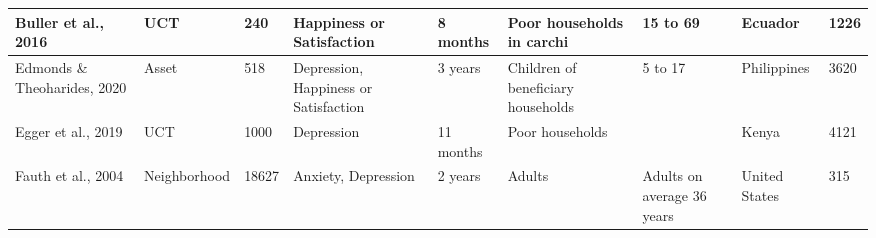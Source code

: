 \begin{table}[ht]
\begin{tabular}{p{1.8cm}p{1.7cm}p{1.3 cm}p{2cm}p{1.7cm}p{2.0cm}p{1cm}p{1.2cm}p{1cm}}
   \hline
Buller et al., 2016 & UCT & 240 & Happiness or Satisfaction & 8 months & Poor households in carchi & 15 to 69 & Ecuador & 1226 \\ 
   \hline
Edmonds \& Theoharides, 2020 & Asset & 518 & Depression, Happiness or Satisfaction & 3 years & Children of beneficiary households & 5 to 17 & Philippines & 3620 \\ 
   \hline
Egger et al., 2019 & UCT & 1000 & Depression & 11 months & Poor households &  & Kenya & 4121 \\ 
   \hline
Fauth et al., 2004 & Neighborhood & 18627 & Anxiety, Depression & 2 years & Adults & Adults on average 36 years & United States & 315 \\ 
   \hline
\end{tabular}
\endgroup
\end{table}
